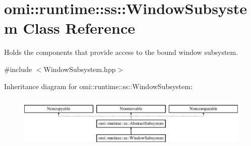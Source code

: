 \hypertarget{classomi_1_1runtime_1_1ss_1_1_window_subsystem}{}\section{omi\+:\+:runtime\+:\+:ss\+:\+:Window\+Subsystem Class Reference}
\label{classomi_1_1runtime_1_1ss_1_1_window_subsystem}


Holds the components that provide access to the bound window subsystem.  




{\ttfamily \#include $<$Window\+Subsystem.\+hpp$>$}

Inheritance diagram for omi\+:\+:runtime\+:\+:ss\+:\+:Window\+Subsystem\+:\begin{figure}[H]
\begin{center}
\leavevmode
\includegraphics[height=2.580645cm]{classomi_1_1runtime_1_1ss_1_1_window_subsystem}
\end{center}
\end{figure}
